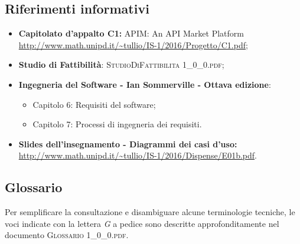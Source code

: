 \subsection{Riferimenti informativi}
\begin{itemize}
	\item \textbf{Capitolato d’appalto C1:} APIM: An API Market Platform\\ \url{http://www.math.unipd.it/~tullio/IS-1/2016/Progetto/C1.pdf};
	\item 	
	\textbf{Studio di Fattibilità}: \textsc{StudioDiFattibilita 1\_0\_0.pdf};
	\item
	\textbf{Ingegneria del Software - Ian Sommerville - Ottava edizione}:
	\begin{itemize}
		\item Capitolo 6: Requisiti del software;
		\item Capitolo 7: Processi di ingegneria dei requisiti.
	\end{itemize} 
	\item
	\textbf{Slides dell'insegnamento - Diagrammi dei casi d'uso:}\\ \url{http://www.math.unipd.it/~tullio/IS-1/2016/Dispense/E01b.pdf}.
\end{itemize}

\subsection{Glossario}
Per semplificare la consultazione e disambiguare alcune terminologie tecniche, le voci indicate con la lettera \textit{G} a pedice sono descritte approfonditamente nel documento \textsc{Glossario 1\_0\_0.pdf}.